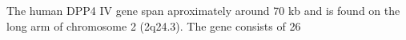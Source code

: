 The human DPP4 IV gene span aproximately around 70 kb and is found on the long arm of chromosome 2 (2q24.3). The gene consists of 26
